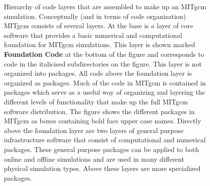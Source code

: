 \begin{figure}
\label{fig:package_organigramme}
\caption{ Hierarchy of code layers that are assembled to make up an MITgcm 
simulation. Conceptually (and in terms of code organization) MITgcm consists
of several layers. At the base is a layer of core software that provides a 
basic numerical and computational foundation for MITgcm simulations. This 
layer is shown marked {\bf Foundation Code} at the bottom of the figure
and corresponds to code in the italicised subdirectories on the figure.
This layer is not organized into packages. All code above the foundation layer
is organized as packages.  Much of the code in MITgcm is contained in packages 
which serve as a useful way of organizing and layering the different levels of 
functionality that make up the full MITgcm software distribution.
The figure shows the different packages in MITgcm as boxes containing bold 
face upper case names.  Directly above the foundation layer are two layers of 
general purpose infrastructure software that consist of computational and 
numerical packages.  These general purpose packages can be applied to both 
online and offline simulations and are used in many different physical 
simulation types.  Above these layers are more specialized packages.  }
\end{figure}

